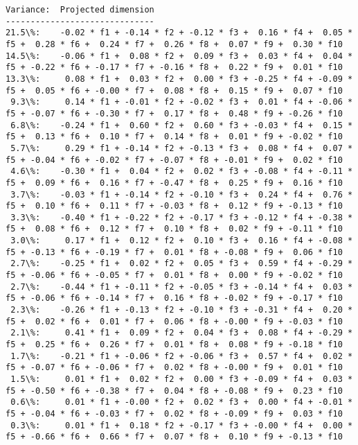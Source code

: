 \documentclass[11pt]{article}
\begin{document}
    \begin{Verbatim}[commandchars=\\\{\}]
Variance:  Projected dimension
------------------------------
21.5\%:    -0.02 * f1 + -0.14 * f2 + -0.12 * f3 +  0.16 * f4 +  0.05 * f5 +  0.28 * f6 +  0.24 * f7 +  0.26 * f8 +  0.07 * f9 +  0.30 * f10
14.5\%:    -0.06 * f1 +  0.08 * f2 +  0.09 * f3 +  0.03 * f4 +  0.04 * f5 + -0.22 * f6 + -0.17 * f7 + -0.16 * f8 +  0.22 * f9 +  0.01 * f10
13.3\%:     0.08 * f1 +  0.03 * f2 +  0.00 * f3 + -0.25 * f4 + -0.09 * f5 +  0.05 * f6 + -0.00 * f7 +  0.08 * f8 +  0.15 * f9 +  0.07 * f10
 9.3\%:     0.14 * f1 + -0.01 * f2 + -0.02 * f3 +  0.01 * f4 + -0.06 * f5 + -0.07 * f6 + -0.30 * f7 +  0.17 * f8 +  0.48 * f9 + -0.26 * f10
 6.8\%:    -0.24 * f1 +  0.60 * f2 +  0.60 * f3 + -0.03 * f4 +  0.15 * f5 +  0.13 * f6 +  0.10 * f7 +  0.14 * f8 +  0.01 * f9 + -0.02 * f10
 5.7\%:     0.29 * f1 + -0.14 * f2 + -0.13 * f3 +  0.08 * f4 +  0.07 * f5 + -0.04 * f6 + -0.02 * f7 + -0.07 * f8 + -0.01 * f9 +  0.02 * f10
 4.6\%:    -0.30 * f1 +  0.04 * f2 +  0.02 * f3 + -0.08 * f4 + -0.11 * f5 +  0.09 * f6 +  0.16 * f7 + -0.47 * f8 +  0.25 * f9 +  0.16 * f10
 3.7\%:    -0.03 * f1 + -0.14 * f2 + -0.10 * f3 +  0.24 * f4 +  0.76 * f5 +  0.10 * f6 +  0.11 * f7 + -0.03 * f8 +  0.12 * f9 + -0.13 * f10
 3.3\%:    -0.40 * f1 + -0.22 * f2 + -0.17 * f3 + -0.12 * f4 + -0.38 * f5 +  0.08 * f6 +  0.12 * f7 +  0.10 * f8 +  0.02 * f9 + -0.11 * f10
 3.0\%:     0.17 * f1 +  0.12 * f2 +  0.10 * f3 +  0.16 * f4 + -0.08 * f5 + -0.13 * f6 + -0.19 * f7 +  0.01 * f8 + -0.08 * f9 +  0.06 * f10
 2.7\%:    -0.25 * f1 +  0.02 * f2 +  0.05 * f3 +  0.59 * f4 + -0.29 * f5 + -0.06 * f6 + -0.05 * f7 +  0.01 * f8 +  0.00 * f9 + -0.02 * f10
 2.7\%:    -0.44 * f1 + -0.11 * f2 + -0.05 * f3 + -0.14 * f4 +  0.03 * f5 + -0.06 * f6 + -0.14 * f7 +  0.16 * f8 + -0.02 * f9 + -0.17 * f10
 2.3\%:    -0.26 * f1 + -0.13 * f2 + -0.10 * f3 + -0.31 * f4 +  0.20 * f5 +  0.02 * f6 +  0.01 * f7 +  0.06 * f8 + -0.00 * f9 + -0.03 * f10
 2.1\%:     0.41 * f1 +  0.09 * f2 +  0.04 * f3 +  0.08 * f4 + -0.29 * f5 +  0.25 * f6 +  0.26 * f7 +  0.01 * f8 +  0.08 * f9 + -0.18 * f10
 1.7\%:    -0.21 * f1 + -0.06 * f2 + -0.06 * f3 +  0.57 * f4 +  0.02 * f5 + -0.07 * f6 + -0.06 * f7 +  0.02 * f8 + -0.00 * f9 +  0.01 * f10
 1.5\%:     0.01 * f1 +  0.02 * f2 +  0.00 * f3 + -0.09 * f4 +  0.03 * f5 + -0.50 * f6 + -0.38 * f7 +  0.04 * f8 + -0.08 * f9 +  0.23 * f10
 0.6\%:     0.01 * f1 + -0.00 * f2 +  0.02 * f3 +  0.00 * f4 + -0.01 * f5 + -0.04 * f6 + -0.03 * f7 +  0.02 * f8 + -0.09 * f9 +  0.03 * f10
 0.3\%:     0.01 * f1 +  0.18 * f2 + -0.17 * f3 + -0.00 * f4 +  0.00 * f5 + -0.66 * f6 +  0.66 * f7 +  0.07 * f8 +  0.10 * f9 + -0.13 * f10

\end{Verbatim}
\end{document}
